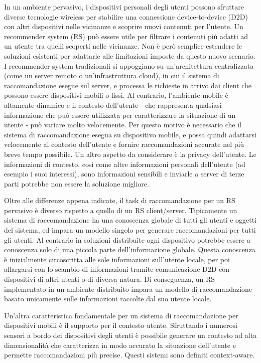 \documentclass[12pt,italian]{report}
\begin{document}
In un ambiente pervasivo, i dispositivi personali degli utenti possono sfruttare diverse tecnologie wireless per stabilire una connessione device-to-device (D2D) con altri dispositivi nelle vicinanze e scoprire nuovi contenuti per l'utente. Un recommender system (RS) può essere utile per filtrare i contenuti più adatti ad un utente tra quelli 
scoperti nelle vicinanze. Non è però semplice estendere le soluzioni esistenti per adattarle alle 
limitazioni imposte da questo nuovo scenario. I recommender system tradizionali si appoggiano su un'architettura centralizzata (come  un server remoto o un'infrastruttura cloud), in cui il sistema di raccomandazione esegue sul server, e processa le richieste in arrivo dai client che possono essere dispositivi mobili o fissi. 
Al contrario, l'ambiente mobile è altamente dinamico e il contesto dell'utente - che rappresenta qualsiasi informazione che può essere utilizzata per caratterizzare la situazione di un utente - può  variare molto velocemente. Per questo motivo è necessario che il sistema di raccomandazione esegua su dispositivo mobile, e possa quindi adattarsi velocemente al contesto dell'utente e fornire raccomandazioni accurate nel più breve tempo possibile. Un altro aspetto da considerare è la privacy dell'utente. Le informazioni di contesto, così come altre informazioni personali dell'utente (ad esempio i suoi interessi), sono informazioni sensibili e inviarle a server di terze parti potrebbe non essere la soluzione migliore.

Oltre alle differenze appena indicate, il task di raccomandazione per un RS pervasivo è diverso rispetto a quello di un RS client/server. Tipicamente un sistema di raccomandazione ha una conoscenza globale di tutti gli utenti e oggetti del sistema, ed impara un modello singolo per generare raccomandazioni per tutti gli utenti. Al contrario in soluzioni distribuite ogni dispositivo potrebbe
essere a conoscenza solo di una piccola parte dell'informazione globale. Questa conoscenza è inizialmente 
circoscritta alle sole informazioni sull'utente locale, per poi allargarsi con lo scambio di informazioni 
tramite comunicazione D2D con dispositivi di altri utenti o di diversa natura. Di conseguenza, 
un RS implementato in un ambiente distribuito impara un modello di raccomandazione basato unicamente 
sulle informazioni raccolte dal suo utente locale. 

Un'altra caratteristica fondamentale per un sistema di raccomandazione per dispositivi mobili è il 
supporto per il contesto utente. Sfruttando i numerosi sensori a bordo dei dispositivi degli utenti è possibile 
generare un contesto ad alta dimensionalità che caratterizza in modo accurato la situazione dell'utente e permette raccomandazioni più precise. Questi sistemi sono definiti context-aware.
\end{document}

